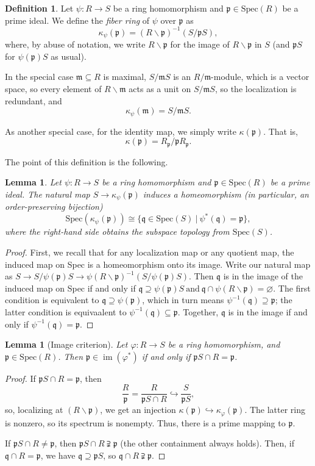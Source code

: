 \documentclass{amsart}[12pt]
\def\image{\operatorname{im}}
\def\im{\image}
\newcommand{\p}{{\mathfrak p}}
\newcommand{\fm}{{\mathfrak m}}
\newcommand{\q}{{\mathfrak q}}
\numberwithin{equation}{section}
\theoremstyle{plain} %
\newtheorem{lemma}[equation]{Lemma}
\theoremstyle{definition}
\newtheorem{defn}[equation]{Definition}
\theoremstyle{remark}
\newcommand{\Spec}{\mathrm{Spec}}
\begin{document}
\begin{defn}
Let $\psi:R\to S$ be a ring homomorphism and $\p\in \Spec(R)$ be a prime ideal. We define the \emph{fiber ring}\index{$\kappa_{\psi}(\p)$} of $\psi$ over $\p$ as
\[ \kappa_{\psi}(\p) = (R\smallsetminus \p)^{-1}(S/\p S),\]
where, by abuse of notation, we write $R\smallsetminus \p$ for the image of $R\smallsetminus \p$ in $S$ (and $\p S$ for $\psi(\p) S$ as usual).

In the special case $\fm \subseteq R$ is maximal, $S/\fm S$ is an $R/\fm$-module, which is a vector space, so every element of $R\smallsetminus \fm$ acts as a unit on $S/\fm S$, so the localization is redundant, and 
\[ \kappa_\psi(\fm) = S/\fm S.\]

As another special case, for the identity map, we simply write $\kappa(\p)$\index{$\kappa(\p)$}. That is, \[\kappa(\p) = R_{\p} / \p R_\p.\]
\end{defn}

The point of this definition is the following.

\begin{lemma} Let $\psi:R\to S$ be a ring homomorphism and $\p\in \Spec(R)$ be a prime ideal. The natural map $S \to \kappa_{\psi}(\p)$ induces a homeomorphism (in particular, an order-preserving bijection)
\[ \Spec( \kappa_{\psi}(\p) ) \cong \{ \q \in \Spec(S) \ | \ \psi^*(\q) = \p \},\]
where the right-hand side obtains the subspace topology from $\Spec(S)$.
\end{lemma}
\begin{proof}
First, we recall that for any localization map or any quotient map, the induced map on Spec is a homeomorphism onto its image. 
Write our natural map as $S\to S/\psi(\p) S \to \psi(R\smallsetminus \p)^{-1}(S/\psi(\p) S)$. Then $\q$ is in the image of the induced map on Spec if and only if $\q \supseteq \psi(\p) S \ \text{and} \ \q \cap \psi(R\smallsetminus \p) = \varnothing$. The first condition is equivalent to $\q \supseteq \psi(\p)$, which in turn means $\psi^{-1}(\q) \supseteq \p$; the latter condition is equivaalent to $\psi^{-1}(\q) \subseteq \p$. Together, $\q$ is in the image if and only if $\psi^{-1}(\q) = \p$.
\end{proof}


\begin{lemma}[Image criterion] Let $\varphi:R \to S$ be a ring homomorphism, and $\p\in \Spec(R)$. Then $\p\in \im(\varphi^*)$ if and only if $\p S \cap R = \p$.
\end{lemma}
\begin{proof}
If $\p S \cap R = \p$, then 
\[ \frac{R}{\p} = \frac{R}{\p S \cap R} \hookrightarrow \frac{S}{\p S},\]
so, localizing at $(R\smallsetminus \p)$, we get an injection $\kappa(\p) \hookrightarrow \kappa_{\varphi}(\p)$. The latter ring is nonzero, so its spectrum is nonempty. Thus, there is a prime mapping to $\p$.

If $\p S \cap R \neq \p$, then $\p S \cap R \supsetneqq \p$ (the other containment always holds). Then, if $\q \cap R = \p$, we have $\q \supseteq \p S$, so $\q \cap R \supsetneqq \p$.
\end{proof}
\end{document}
